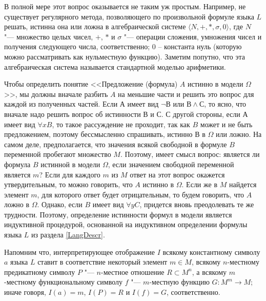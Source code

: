\documentclass[b5paper,11pt]{book}
\begin{document}
	В полной мере этот вопрос  оказывается не таким уж простым.	Например, не существует регулярного метода, позволяющего по произвольной формуле языка $L$ решать, истинна она или ложна в алгебраической системе $\langle N, +, *,\sigma, 0\rangle$, где $N$ "--- множество целых чисел, $+$, $*$ и $\sigma$ "--- операции сложения, умножения чисел и получения следующего числа, соответственно; 0 – константа нуль (которую можно рассматривать как нульместную функцию). Заметим попутно, что эта алгебраическая  система называется стандартной моделью арифметики.
	
	Чтобы определить понятие <<Предложение (формула) $A$ истинно в модели $\Omega$>>, мы должны вначале разбить $A$ на меньшие части и решить это вопрос для каждой из полученных частей. Если $А$ имеет вид  $\neg В$ или $В\wedge С$, то ясно, что вначале надо решить вопрос об истинности $В$ и $С$. С другой стороны, если $А$ имеет вид $\forall x B$, то такое рассуждение не проходит, так как $B$ может и не быть предложением, поэтому бессмысленно спрашивать,  истинно $В$ в $\Omega$ или ложно. На самом деле, предполагается, что значения всякой свободной в формуле $B$ переменной пробегают множество $M$. Поэтому, имеет смысл вопрос: является ли формула $B$ истинной в модели $\Omega$, если значением  свободной переменной является $m$? Если для каждого $m$ из $M$ ответ на этот вопрос окажется утвердительным, то можно говорить, что $A$ истинно в $\Omega$. Если же в $M$ найдется элемент $m$, для которого ответ будет отрицательным, то будем говорить, что $A$ ложно в $\Omega$. Однако, если $B$ имеет вид $\forall y C$, придется вновь преодолевать те же трудности. Поэтому, определение истинности формул в модели является  индуктивной процедурой, основанной на индуктивном определении формулы языка $L$ из раздела \ref{LangDescr}.
	
	Напомним что, интерпретирующее отображение $I$ всякому константному символу $a$ языка $L$  ставит в соответствие некоторый элемент $m\in M$, всякому $n$-местному предикатному символу $P$ "--- $n$-местное отношение $R\subset M^n$, а всякому $m$-местному функциональному символу $f$ "--- $m$-местную функцию $G:M^m\rightarrow M$; иначе говоря,  $I(a)=m$, $I(P)=R$ и $I(f)=G$, соответственно. 
	
\end{document}
